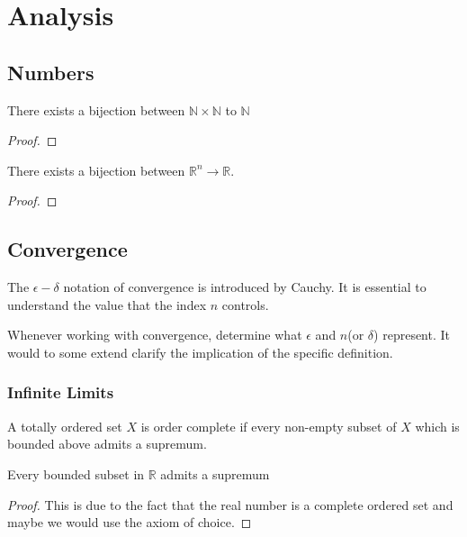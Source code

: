 \chapter{Analysis}
\section{Numbers}
\begin{theorem}
	There exists a bijection between $\mathbb{N} \times \mathbb{N}$ to $\mathbb{N}$
\end{theorem}
\begin{proof}
\end{proof}

\begin{theorem}
	There exists a bijection between $\mathbb{R}^n \rightarrow \mathbb{R}$.
\end{theorem}
\begin{proof}
\end{proof}


\section{Convergence}
The $\epsilon-\delta$ notation of convergence is introduced by Cauchy. It is essential to understand the value that the index $n$ controls.\par 
Whenever working with convergence, determine what $\epsilon$ and $n$(or $\delta$) represent. It would to some extend clarify the implication of the specific definition.


\subsection{Infinite Limits}

\begin{definition}
	A totally ordered set $X$ is order complete if every non-empty subset of $X$ which is bounded above admits a supremum.
\end{definition}

\begin{definition}
	
\end{definition}

\begin{theorem}
	Every bounded subset in $\mathbb{R}$ admits a supremum
\end{theorem}
\begin{proof}
	This is due to the fact that the real number is a complete ordered set and maybe we would use the axiom of choice.
\end{proof}




